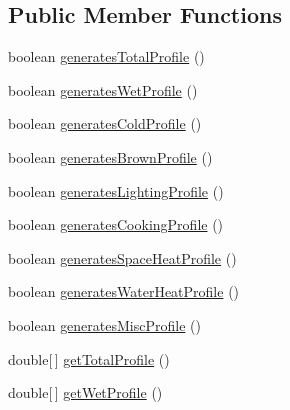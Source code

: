 \subsection*{Public Member Functions}
\begin{DoxyCompactItemize}
\item 
boolean \hyperlink{interfaceuk_1_1ac_1_1dmu_1_1iesd_1_1cascade_1_1util_1_1profilegenerators_1_1_profile_generator_a03ce4a4efee11e9fd5a7f1f408f2083b}{generates\-Total\-Profile} ()
\item 
boolean \hyperlink{interfaceuk_1_1ac_1_1dmu_1_1iesd_1_1cascade_1_1util_1_1profilegenerators_1_1_profile_generator_a7872d2ee0f8190783e7a17ecd699dd70}{generates\-Wet\-Profile} ()
\item 
boolean \hyperlink{interfaceuk_1_1ac_1_1dmu_1_1iesd_1_1cascade_1_1util_1_1profilegenerators_1_1_profile_generator_adad9f0b49f993ffea0ad9fbdebf2f806}{generates\-Cold\-Profile} ()
\item 
boolean \hyperlink{interfaceuk_1_1ac_1_1dmu_1_1iesd_1_1cascade_1_1util_1_1profilegenerators_1_1_profile_generator_ab153edf81baf97f0fdffab0ab87d0731}{generates\-Brown\-Profile} ()
\item 
boolean \hyperlink{interfaceuk_1_1ac_1_1dmu_1_1iesd_1_1cascade_1_1util_1_1profilegenerators_1_1_profile_generator_ae727d4e45bcabd2df9b7116bf72af462}{generates\-Lighting\-Profile} ()
\item 
boolean \hyperlink{interfaceuk_1_1ac_1_1dmu_1_1iesd_1_1cascade_1_1util_1_1profilegenerators_1_1_profile_generator_a2eb6b8c2fff79b830a722eb838af5086}{generates\-Cooking\-Profile} ()
\item 
boolean \hyperlink{interfaceuk_1_1ac_1_1dmu_1_1iesd_1_1cascade_1_1util_1_1profilegenerators_1_1_profile_generator_ac29dfa4de542a970b9e9e020689cd835}{generates\-Space\-Heat\-Profile} ()
\item 
boolean \hyperlink{interfaceuk_1_1ac_1_1dmu_1_1iesd_1_1cascade_1_1util_1_1profilegenerators_1_1_profile_generator_ab105809ea32ff56b1105246b0d4f2578}{generates\-Water\-Heat\-Profile} ()
\item 
boolean \hyperlink{interfaceuk_1_1ac_1_1dmu_1_1iesd_1_1cascade_1_1util_1_1profilegenerators_1_1_profile_generator_aabea9d9fd10b82dec60351373d08282b}{generates\-Misc\-Profile} ()
\item 
double\mbox{[}$\,$\mbox{]} \hyperlink{interfaceuk_1_1ac_1_1dmu_1_1iesd_1_1cascade_1_1util_1_1profilegenerators_1_1_profile_generator_a06a3d4c98934dbc9e13e3918e5c1b416}{get\-Total\-Profile} ()
\item 
double\mbox{[}$\,$\mbox{]} \hyperlink{interfaceuk_1_1ac_1_1dmu_1_1iesd_1_1cascade_1_1util_1_1profilegenerators_1_1_profile_generator_a682b86a89f79bf5500b8c7b4f1eeddba}{get\-Wet\-Profile} ()

\end{DoxyCompactItemize}
